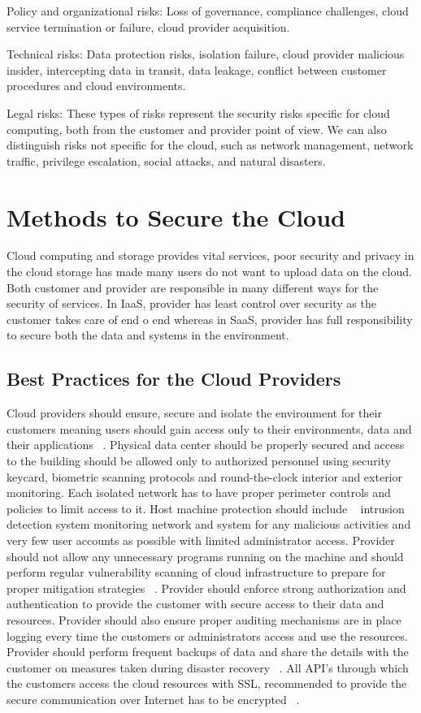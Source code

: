 \documentclass[sigconf]{acmart}
\begin{document}
    Policy and organizational risks: Loss of governance, compliance challenges, 
cloud service termination or failure, cloud provider acquisition.

    Technical risks: Data protection risks, isolation failure, cloud provider 
malicious insider, intercepting data in transit, data leakage, conflict 
between customer procedures and cloud environments.

    Legal risks: These types of risks represent the security risks specific 
for cloud computing, both from the customer and provider point of view. 
We can also distinguish risks not specific for the cloud, such as network 
management, network traffic, privilege escalation, social attacks, and 
natural disasters.

\section{Methods to Secure the Cloud}
Cloud computing and storage provides vital services, poor security and 
privacy in the cloud storage has made many users do not want to 
upload data on the cloud. Both customer and provider are responsible in many
different ways for the security of services. In IaaS, provider has least control
over security as the customer takes care of end o end whereas in SaaS, provider
has full responsibility to secure both the data and systems in the environment.

\subsection{Best Practices for the Cloud Providers}
Cloud providers should ensure, secure and isolate the environment for their 
customers meaning users should gain access only to their environments, data
and their applications ~\cite{hid-sp18-513-vmware}. Physical data center should be properly secured 
and access to the building should be allowed only to authorized personnel 
using security keycard, biometric scanning protocols and round-the-clock
interior and exterior monitoring. Each isolated network has to have proper 
perimeter controls and policies to limit access to it.
Host machine protection should include ~\cite{hid-sp18-513-diversity} intrusion detection system 
monitoring network and system for any malicious activities and very 
few user accounts as possible with limited administrator access. Provider
should not allow any unnecessary programs running on the machine and should 
perform regular vulnerability scanning of cloud infrastructure to prepare 
for proper mitigation strategies ~\cite{hid-sp18-513-winkler}. Provider should enforce strong 
authorization and authentication to provide the customer with secure access 
to their data and resources. Provider should also ensure proper auditing 
mechanisms are in place logging every time the customers or administrators
access and use the resources. Provider should perform frequent backups of 
data and share the details with the customer on measures taken during 
disaster recovery ~\cite{hid-sp18-513-vmware}. All API's through which the customers access
the cloud resources with SSL, recommended to provide the secure
communication over Internet has to be encrypted ~\cite{hid-sp18-513-diversity}.
\end{document}

